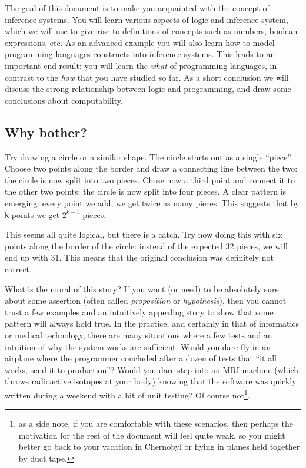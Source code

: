 The goal of this document is to make you acquainted with the concept of inference systems. You will learn various aspects of logic and inference system, which we will use to give rise to definitions of concepts such as numbers, boolean expressions, etc. As an advanced example you will also learn how to model programming languages constructs into inference systems. This leads to an important end result: you will learn the \textit{what} of programming languages, in contrast to the \textit{how} that you have studied so far. As a short conclusion we will discuss the strong relationship between logic and programming, and draw some conclusions about computability.

\subsection{Why bother?}
Try drawing a circle or a similar shape. The circle starts out as a single ``piece''. Choose two points along the border and draw a connecting line between the two: the circle is now split into two pieces. Chose now a third point and connect it to the other two points: the circle is now split into four pieces. A clear pattern is emerging: every point we add, we get twice as many pieces. This suggests that by \texttt{k} points we get $2^{k-1}$ pieces.

This seems all quite logical, but there is a catch. Try now doing this with six points along the border of the circle: instead of the expected 32 pieces, we will end up with 31. This means that the original conclusion was definitely not correct.

What is the moral of this story? If you want (or need) to be absolutely sure about some assertion (often called \textit{proposition} or \textit{hypothesis}), then you cannot trust a few examples and an intuitively appealing story to show that some pattern will always hold true. In the practice, and certainly in that of informatics or medical technology, there are many situations where a few tests and an intuition of why the system works are sufficient. Would you dare fly in an airplane where the programmer concluded after a dozen of tests that ``it all works, send it to production''? Would you dare step into an MRI machine (which throws radioactive isotopes at your body) knowing that the software was quickly written during a weekend with a bit of unit testing? Of course not\footnote{as a side note, if you are comfortable with these scenarios, then perhaps the motivation for the rest of the document will feel quite weak, so you might better go back to your vacation in Chernobyl or flying in planes held together by duct tape.}.


